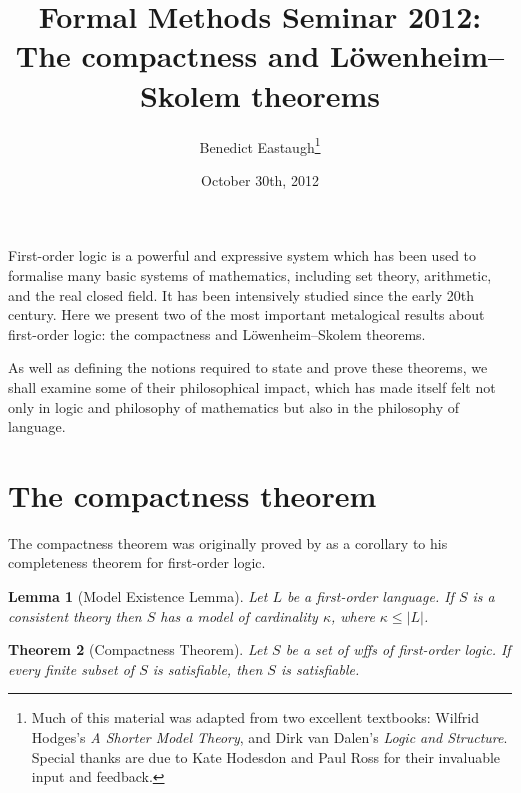 \documentclass[10pt, a4paper, oneside]{article}
\title{Formal Methods Seminar 2012:\\
       The compactness and Löwenheim--Skolem theorems}
\author{Benedict Eastaugh\footnote{Much of this material was adapted from two
        excellent textbooks: Wilfrid Hodges's \emph{A Shorter Model Theory}, and
        Dirk van Dalen's \emph{Logic and Structure}. Special thanks are due to
        Kate Hodesdon and Paul Ross for their invaluable input and feedback.}}
\date{October 30th, 2012}
\newtheorem{thm}{Theorem}[section]
\theoremstyle{definition}
\theoremstyle{remark}
\theoremstyle{plain}
\newtheorem{lem}[thm]{Lemma}
\theoremstyle{plain}
\begin{document}
\maketitle

First-order logic is a powerful and expressive system which has been used to
formalise many basic systems of mathematics, including set theory, arithmetic,
and the real closed field. It has been intensively studied since the early 20th
century. Here we present two of the most important metalogical results about
first-order logic: the compactness and Löwenheim--Skolem theorems.

As well as defining the notions required to state and prove these theorems, we
shall examine some of their philosophical impact, which has made itself felt not
only in logic and philosophy of mathematics but also in the philosophy of
language.

\section{The compactness theorem}

The compactness theorem was originally proved by \citet{godel1930} as a
corollary to his completeness theorem for first-order logic.

\begin{lem}[Model Existence Lemma]
    \label{lem:model_existence}
    Let $L$ be a first-order language. If $S$ is a consistent theory then $S$
    has a model of cardinality $\kappa$, where $\kappa \leq |L|$.
\end{lem}

\begin{thm}[Compactness Theorem]
    \label{compactness}
    Let $S$ be a set of wffs of first-order logic. If every finite subset of $S$
    is satisfiable, then $S$ is satisfiable.
\end{thm}
\end{document}
